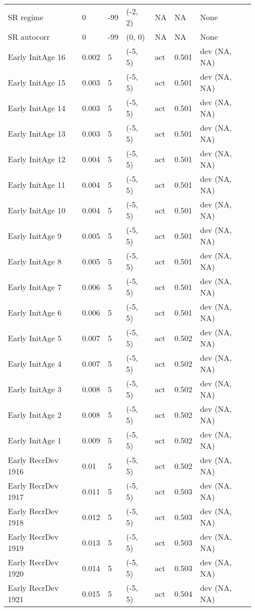 \documentclass[11pt,
  english,
  letterpaper,
]{article}
\begin{document}
\begin{landscape}
\begin{longtable}[t]{>{\raggedright\arraybackslash}p{7.5cm}lllll>{\raggedright\arraybackslash}p{3.5cm}}
SR regime & 0 & -99 & (-2, 2) & NA & NA & None\\
SR autocorr & 0 & -99 & (0, 0) & NA & NA & None\\
Early InitAge 16 & 0.002 & 5 & (-5, 5) & act & 0.501 & dev (NA, NA)\\
Early InitAge 15 & 0.003 & 5 & (-5, 5) & act & 0.501 & dev (NA, NA)\\
Early InitAge 14 & 0.003 & 5 & (-5, 5) & act & 0.501 & dev (NA, NA)\\
Early InitAge 13 & 0.003 & 5 & (-5, 5) & act & 0.501 & dev (NA, NA)\\
Early InitAge 12 & 0.004 & 5 & (-5, 5) & act & 0.501 & dev (NA, NA)\\
Early InitAge 11 & 0.004 & 5 & (-5, 5) & act & 0.501 & dev (NA, NA)\\
Early InitAge 10 & 0.004 & 5 & (-5, 5) & act & 0.501 & dev (NA, NA)\\
Early InitAge 9 & 0.005 & 5 & (-5, 5) & act & 0.501 & dev (NA, NA)\\
Early InitAge 8 & 0.005 & 5 & (-5, 5) & act & 0.501 & dev (NA, NA)\\
Early InitAge 7 & 0.006 & 5 & (-5, 5) & act & 0.501 & dev (NA, NA)\\
Early InitAge 6 & 0.006 & 5 & (-5, 5) & act & 0.501 & dev (NA, NA)\\
Early InitAge 5 & 0.007 & 5 & (-5, 5) & act & 0.502 & dev (NA, NA)\\
Early InitAge 4 & 0.007 & 5 & (-5, 5) & act & 0.502 & dev (NA, NA)\\
Early InitAge 3 & 0.008 & 5 & (-5, 5) & act & 0.502 & dev (NA, NA)\\
Early InitAge 2 & 0.008 & 5 & (-5, 5) & act & 0.502 & dev (NA, NA)\\
Early InitAge 1 & 0.009 & 5 & (-5, 5) & act & 0.502 & dev (NA, NA)\\
Early RecrDev 1916 & 0.01 & 5 & (-5, 5) & act & 0.502 & dev (NA, NA)\\
Early RecrDev 1917 & 0.011 & 5 & (-5, 5) & act & 0.503 & dev (NA, NA)\\
Early RecrDev 1918 & 0.012 & 5 & (-5, 5) & act & 0.503 & dev (NA, NA)\\
Early RecrDev 1919 & 0.013 & 5 & (-5, 5) & act & 0.503 & dev (NA, NA)\\
Early RecrDev 1920 & 0.014 & 5 & (-5, 5) & act & 0.503 & dev (NA, NA)\\
Early RecrDev 1921 & 0.015 & 5 & (-5, 5) & act & 0.504 & dev (NA, NA)\\

\end{longtable}
\end{landscape}
\end{document}
